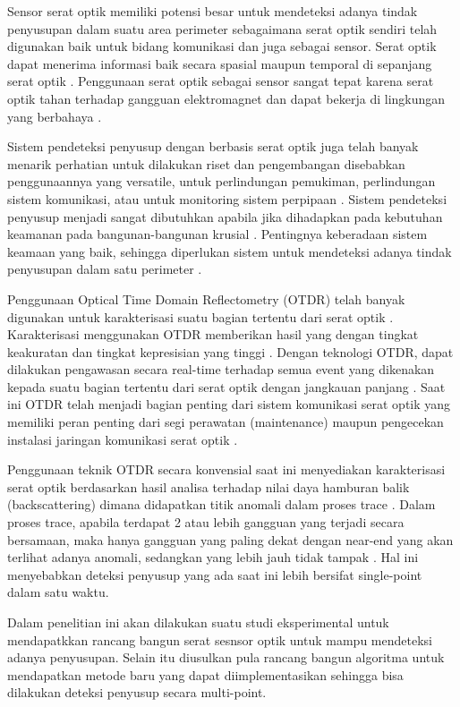 \documentclass[12pt]{article}
\begin{document}
	Sensor serat optik memiliki potensi besar untuk mendeteksi adanya tindak penyusupan dalam suatu area perimeter sebagaimana serat optik sendiri telah digunakan baik untuk bidang komunikasi dan juga sebagai sensor.
	Serat optik dapat menerima informasi baik secara spasial maupun temporal di sepanjang serat optik \cite{Rao2008}.
	Penggunaan serat optik sebagai sensor sangat tepat karena serat optik tahan terhadap gangguan elektromagnet dan dapat bekerja di lingkungan yang berbahaya \cite{Bremer2016}.
	
	Sistem pendeteksi penyusup dengan berbasis serat optik juga telah banyak menarik perhatian untuk dilakukan riset dan pengembangan disebabkan penggunaannya yang versatile, untuk perlindungan pemukiman, perlindungan sistem komunikasi, atau untuk monitoring sistem perpipaan \cite{Lai2017}.
	Sistem pendeteksi penyusup menjadi sangat dibutuhkan apabila jika dihadapkan pada kebutuhan keamanan pada bangunan-bangunan krusial \cite{Quwaider2017}.
	Pentingnya keberadaan sistem keamaan yang baik, sehingga diperlukan sistem untuk mendeteksi adanya tindak penyusupan dalam satu perimeter \cite{Huang2017}.
	
	Penggunaan Optical Time Domain Reflectometry (OTDR) telah banyak digunakan untuk karakterisasi suatu bagian tertentu dari serat optik \cite{Dong2015}.
	Karakterisasi menggunakan OTDR memberikan hasil yang dengan tingkat keakuratan dan tingkat kepresisian yang tinggi \cite{He2016}.
	Dengan teknologi OTDR, dapat dilakukan pengawasan secara real-time terhadap semua event yang dikenakan kepada suatu bagian tertentu dari serat optik dengan jangkauan panjang \cite{Optical2007}.
	Saat ini OTDR telah menjadi bagian penting dari sistem komunikasi serat optik yang memiliki peran penting dari segi perawatan (maintenance) maupun pengecekan instalasi jaringan komunikasi serat optik \cite{Nettest2000}.
	
	Penggunaan teknik OTDR secara konvensial saat ini menyediakan karakterisasi serat optik berdasarkan hasil analisa terhadap nilai daya hamburan balik (backscattering) dimana didapatkan titik anomali dalam proses trace \cite{Dong2015}.
	Dalam proses trace, apabila terdapat 2 atau lebih gangguan yang terjadi secara bersamaan, maka hanya gangguan yang paling dekat dengan near-end  yang akan terlihat adanya anomali, sedangkan yang lebih jauh tidak tampak \cite{Bao2012}.
	Hal ini menyebabkan deteksi penyusup yang ada saat ini lebih bersifat single-point dalam satu waktu. 
	
	Dalam penelitian ini akan dilakukan suatu studi eksperimental untuk mendapatkkan rancang bangun serat sesnsor optik untuk mampu mendeteksi adanya penyusupan.
	Selain itu diusulkan pula rancang bangun algoritma untuk mendapatkan metode baru yang dapat diimplementasikan sehingga bisa dilakukan deteksi penyusup secara multi-point.
		
\end{document}
